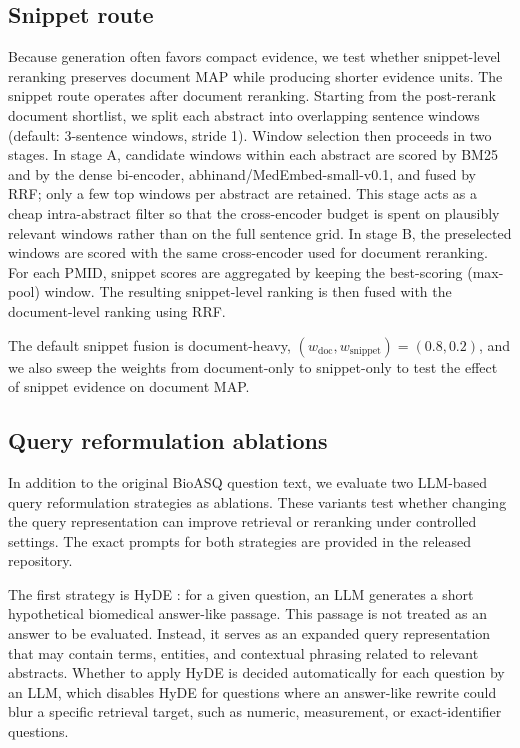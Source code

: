 \documentclass[
]{ceurart}
\begin{document}
\subsection{Snippet route}

Because generation often favors compact evidence, we test whether snippet-level reranking preserves document MAP while producing shorter evidence units. The snippet route operates after document reranking. Starting from the post-rerank document shortlist, we split each abstract into overlapping sentence windows (default: 3-sentence windows, stride 1). Window selection then proceeds in two stages. In stage A, candidate windows within each abstract are scored by BM25 and by the dense bi-encoder, abhinand/MedEmbed-small-v0.1, and fused by RRF; only a few top windows per abstract are retained. This stage acts as a cheap intra-abstract filter so that the cross-encoder budget is spent on plausibly relevant windows rather than on the full sentence grid. In stage B, the preselected windows are scored with the same cross-encoder used for document reranking. For each PMID, snippet scores are aggregated by keeping the best-scoring (max-pool) window. The resulting snippet-level ranking is then fused with the document-level ranking using RRF.

The default snippet fusion is document-heavy, $(w_{\mathrm{doc}}, w_{\mathrm{snippet}})=(0.8,0.2)$, and we also sweep the weights from document-only to snippet-only to test the effect of snippet evidence on document MAP.

\subsection{Query reformulation ablations}

In addition to the original BioASQ question text, we evaluate two LLM-based query reformulation strategies as ablations. These variants test whether changing the query representation can improve retrieval or reranking under controlled settings. The exact prompts for both strategies are provided in the released repository.

The first strategy is HyDE \cite{gao2023hyde}: for a given question, an LLM generates a short hypothetical biomedical answer-like passage. This passage is not treated as an answer to be evaluated. Instead, it serves as an expanded query representation that may contain terms, entities, and contextual phrasing related to relevant abstracts. Whether to apply HyDE is decided automatically for each question by an LLM, which disables HyDE for questions where an answer-like rewrite could blur a specific retrieval target, such as numeric, measurement, or exact-identifier questions.
\end{document}
